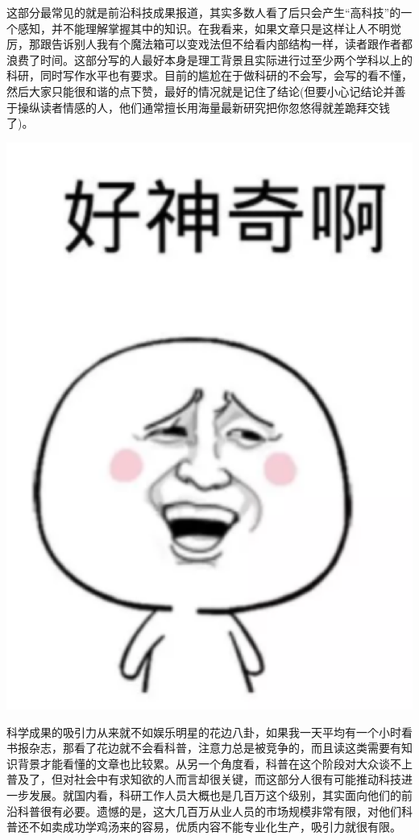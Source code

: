 \documentclass[]{book}
\begin{document}
这部分最常见的就是前沿科技成果报道，其实多数人看了后只会产生``高科技''的一个感知，并不能理解掌握其中的知识。在我看来，如果文章只是这样让人不明觉厉，那跟告诉别人我有个魔法箱可以变戏法但不给看内部结构一样，读者跟作者都浪费了时间。这部分写的人最好本身是理工背景且实际进行过至少两个学科以上的科研，同时写作水平也有要求。目前的尴尬在于做科研的不会写，会写的看不懂，然后大家只能很和谐的点下赞，最好的情况就是记住了结论(但要小心记结论并善于操纵读者情感的人，他们通常擅长用海量最新研究把你忽悠得就差跪拜交钱了)。

\includegraphics[width=5.97in]{images/pops5}

科学成果的吸引力从来就不如娱乐明星的花边八卦，如果我一天平均有一个小时看书报杂志，那看了花边就不会看科普，注意力总是被竞争的，而且读这类需要有知识背景才能看懂的文章也比较累。从另一个角度看，科普在这个阶段对大众谈不上普及了，但对社会中有求知欲的人而言却很关键，而这部分人很有可能推动科技进一步发展。就国内看，科研工作人员大概也是几百万这个级别，其实面向他们的前沿科普很有必要。遗憾的是，这大几百万从业人员的市场规模非常有限，对他们科普还不如卖成功学鸡汤来的容易，优质内容不能专业化生产，吸引力就很有限。
\end{document}
